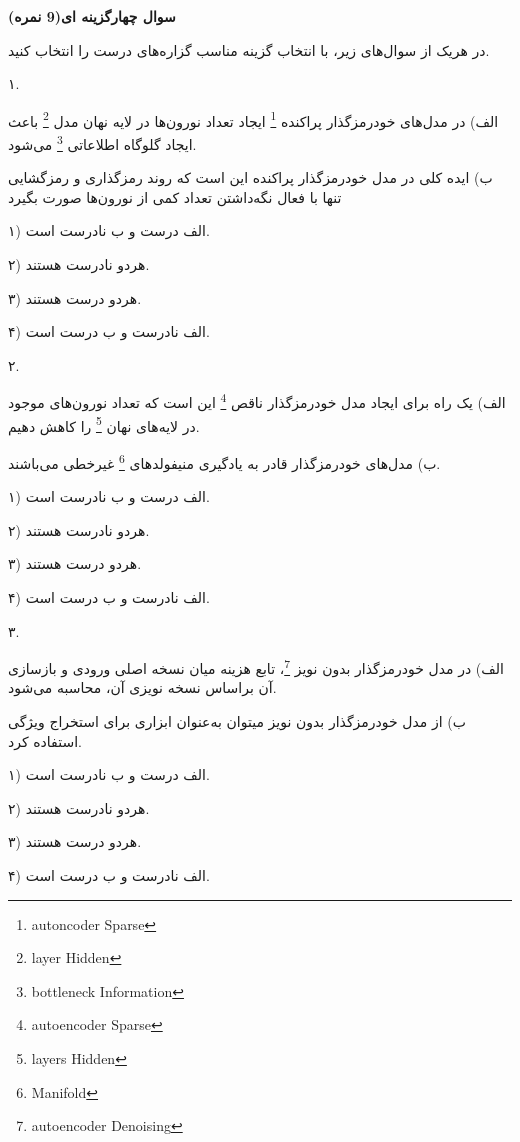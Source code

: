 \textbf{سوال چهارگزینه ای(9 نمره)}



در هریک از سوال‌های زیر، با انتخاب گزینه مناسب گزاره‌های درست را انتخاب کنید.

\vspace{0.5cm}
۱.

الف) در مدل‌های خودرمز‌گذار پراکنده \footnote{autoncoder Sparse} ایجاد تعداد نورون‌ها در لایه نهان مدل \footnote{layer Hidden} باعث ایجاد گلوگاه اطلاعاتی \footnote{bottleneck Information} می‌شود.

\vspace{0.25cm}
ب) ایده کلی در مدل خودرمز‌گذار پراکنده این است که روند رمز‌گذاری و رمزگشایی تنها با فعال نگه‌داشتن تعداد کمی از نورون‌ها صورت بگیرد

\vspace{0.5cm}
۱)  الف درست و ب نادرست است.

\vspace{0.25cm}
۲) هردو نادرست هستند.

\vspace{0.25cm}
۳) هردو درست هستند.

\vspace{0.25cm}
۴)  الف نادرست و ب درست است.

\vspace{0.5cm}
۲.

الف) یک راه برای ایجاد مدل خودرمز‌گذار ناقص \footnote{autoencoder Sparse} این است که تعداد نورون‌های موجود در لایه‌های نهان \footnote{layers Hidden} را کاهش دهیم.

\vspace{0.25cm}
ب) مدل‌های خودرمزگذار قادر به یادگیری منیفولد‌های \footnote{Manifold} غیرخطی می‌باشند.

\vspace{0.5cm}
۱) الف درست و ب نادرست است.

\vspace{0.25cm}
۲) هردو نادرست هستند.

\vspace{0.25cm}
۳) هردو درست هستند.

\vspace{0.25cm}
۴) الف نادرست و ب درست است.

\vspace{0.5cm}
۳.

الف) در مدل خودرمزگذار بدون نویز \footnote{autoencoder Denoising}، تابع هزینه میان نسخه اصلی ورودی و بازسازی آن براساس نسخه نویزی آن، محاسبه می‌شود.

\vspace{0.25cm}
ب) از مدل خودرمزگذار بدون نویز میتوان به‌عنوان ابزاری برای استخراج ویژگی استفاده کرد.

\vspace{0.5cm}
۱) الف درست و ب نادرست است.

\vspace{0.25cm}
۲) هردو نادرست هستند.

\vspace{0.25cm}
۳) هردو درست هستند.

\vspace{0.25cm}
۴) الف نادرست و ب درست است.
